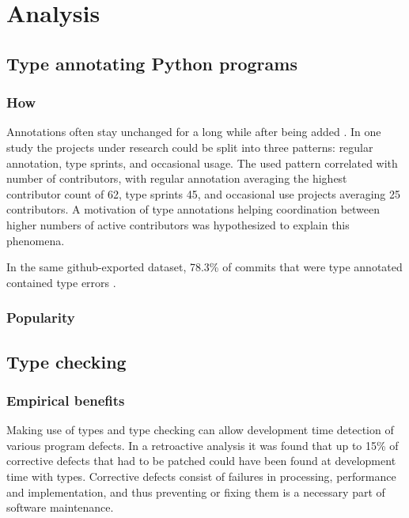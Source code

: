 \chapter{Analysis\label{analysis}}

\section{Type annotating Python programs}


\subsection{How}
Annotations often stay unchanged for a long while after being added \cite{di_grazia_evolution_2022}. In one study the projects under research  could be split into three patterns: regular annotation, type sprints, and occasional usage. The used pattern correlated with number of contributors, with regular annotation averaging the highest contributor count of 62, type sprints 45, and occasional use projects averaging 25 contributors. A motivation of type annotations helping coordination between higher numbers of active contributors was hypothesized to explain this phenomena.

In the same github-exported dataset, 78.3\% of commits that were type annotated contained type errors \cite{di_grazia_evolution_2022}.


\subsection{Popularity}


\section{Type checking}

\subsection{Empirical benefits}

Making use of types and type checking can allow development time detection of various program defects. In a retroactive analysis it was found that up to 15\% of corrective defects that had to be patched could have been found at development time with types\cite{khan_empirical_2022}. Corrective defects consist of failures in processing, performance and implementation, and thus preventing or fixing them is a necessary part of software maintenance.

